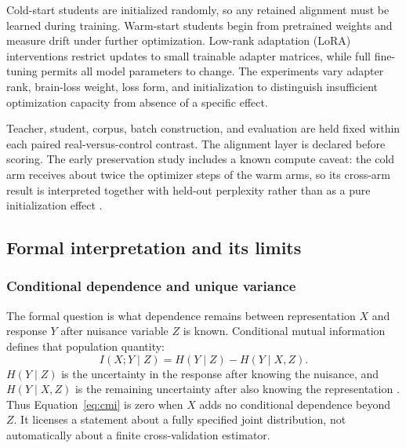 Cold-start students are initialized randomly, so any retained alignment must be learned during training.
Warm-start students begin from pretrained weights and measure drift under further optimization.
Low-rank adaptation (LoRA) interventions restrict updates to small trainable adapter matrices, while full fine-tuning permits all model parameters to change.
The experiments vary adapter rank, brain-loss weight, loss form, and initialization to distinguish insufficient optimization capacity from absence of a specific effect.

Teacher, student, corpus, batch construction, and evaluation are held fixed within each paired real-versus-control contrast.
The alignment layer is declared before scoring.
The early preservation study includes a known compute caveat: the cold arm receives about twice the optimizer steps of the warm arms, so its cross-arm result is interpreted together with held-out perplexity rather than as a pure initialization effect .

\subsection{Formal interpretation and its limits}

\subsubsection{Conditional dependence and unique variance}

The formal question is what dependence remains between representation $X$ and response $Y$ after nuisance variable $Z$ is known.
Conditional mutual information defines that population quantity:
\begin{equation}
  I(X;Y\mid Z)=H(Y\mid Z)-H(Y\mid X,Z).
  \label{eq:cmi}
\end{equation}
$H(Y\mid Z)$ is the uncertainty in the response after knowing the nuisance, and $H(Y\mid X,Z)$ is the remaining uncertainty after also knowing the representation \autocite{cover2006}.
Thus Equation~\ref{eq:cmi} is zero when $X$ adds no conditional dependence beyond $Z$.
It licenses a statement about a fully specified joint distribution, not automatically about a finite cross-validation estimator.

